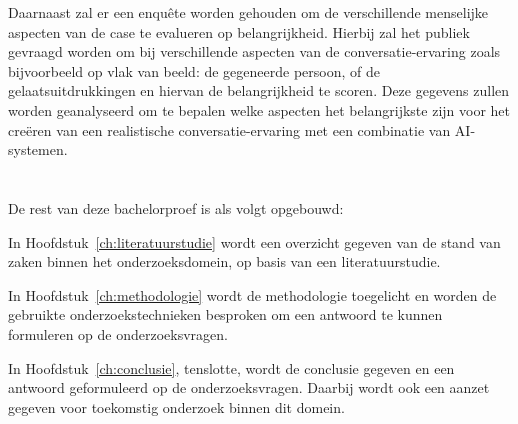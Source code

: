 Daarnaast zal er een enquête worden gehouden om de verschillende menselijke aspecten van de case te evalueren op belangrijkheid. 
Hierbij zal het publiek gevraagd worden om bij verschillende aspecten van de conversatie-ervaring zoals bijvoorbeeld op vlak van beeld: de gegeneerde persoon, of de gelaatsuitdrukkingen en hiervan de belangrijkheid te scoren. Deze gegevens zullen worden geanalyseerd om te bepalen welke aspecten het belangrijkste zijn voor het creëren van een realistische conversatie-ervaring met een combinatie van AI-systemen.

\section{}
\label{sec:opzet-bachelorproef}


De rest van deze bachelorproef is als volgt opgebouwd:

In Hoofdstuk~\ref{ch:literatuurstudie} wordt een overzicht gegeven van de stand van zaken binnen het onderzoeksdomein, op basis van een literatuurstudie.

In Hoofdstuk~\ref{ch:methodologie} wordt de methodologie toegelicht en worden de gebruikte onderzoekstechnieken besproken om een antwoord te kunnen formuleren op de onderzoeksvragen.


In Hoofdstuk~\ref{ch:conclusie}, tenslotte, wordt de conclusie gegeven en een antwoord geformuleerd op de onderzoeksvragen. Daarbij wordt ook een aanzet gegeven voor toekomstig onderzoek binnen dit domein.